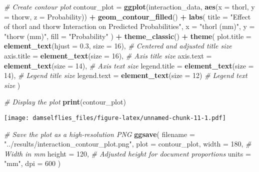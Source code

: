 \documentclass[
]{article}
\newenvironment{Shaded}{\begin{snugshade}}{\end{snugshade}}
\newcommand{\AttributeTok}[1]{\textcolor[rgb]{0.13,0.29,0.53}{#1}}
\newcommand{\CommentTok}[1]{\textcolor[rgb]{0.56,0.35,0.01}{\textit{#1}}}
\newcommand{\DecValTok}[1]{\textcolor[rgb]{0.00,0.00,0.81}{#1}}
\newcommand{\FloatTok}[1]{\textcolor[rgb]{0.00,0.00,0.81}{#1}}
\newcommand{\FunctionTok}[1]{\textcolor[rgb]{0.13,0.29,0.53}{\textbf{#1}}}
\newcommand{\NormalTok}[1]{#1}
\newcommand{\OtherTok}[1]{\textcolor[rgb]{0.56,0.35,0.01}{#1}}
\newcommand{\SpecialCharTok}[1]{\textcolor[rgb]{0.81,0.36,0.00}{\textbf{#1}}}
\newcommand{\StringTok}[1]{\textcolor[rgb]{0.31,0.60,0.02}{#1}}
\begin{document}
\begin{Shaded}
\begin{Highlighting}[]
\CommentTok{\# Create contour plot}
\NormalTok{contour\_plot }\OtherTok{=} \FunctionTok{ggplot}\NormalTok{(interaction\_data, }\FunctionTok{aes}\NormalTok{(}\AttributeTok{x =}\NormalTok{ thorl, }\AttributeTok{y =}\NormalTok{ thorw, }\AttributeTok{z =}\NormalTok{ Probability)) }\SpecialCharTok{+}
  \FunctionTok{geom\_contour\_filled}\NormalTok{() }\SpecialCharTok{+}
  \FunctionTok{labs}\NormalTok{(}
    \AttributeTok{title =} \StringTok{"Effect of thorl and thorw Interaction on Predicted Probabilities"}\NormalTok{,}
    \AttributeTok{x =} \StringTok{"thorl (mm)"}\NormalTok{,}
    \AttributeTok{y =} \StringTok{"thorw (mm)"}\NormalTok{,}
    \AttributeTok{fill =} \StringTok{"Probability"}
\NormalTok{  ) }\SpecialCharTok{+}
  \FunctionTok{theme\_classic}\NormalTok{() }\SpecialCharTok{+}
  \FunctionTok{theme}\NormalTok{(}
    \AttributeTok{plot.title =} \FunctionTok{element\_text}\NormalTok{(}\AttributeTok{hjust =} \FloatTok{0.3}\NormalTok{, }\AttributeTok{size =} \DecValTok{16}\NormalTok{),  }\CommentTok{\# Centered and adjusted title size}
    \AttributeTok{axis.title =} \FunctionTok{element\_text}\NormalTok{(}\AttributeTok{size =} \DecValTok{16}\NormalTok{),               }\CommentTok{\# Axis title size}
    \AttributeTok{axis.text =} \FunctionTok{element\_text}\NormalTok{(}\AttributeTok{size =} \DecValTok{14}\NormalTok{),                }\CommentTok{\# Axis text size}
    \AttributeTok{legend.title =} \FunctionTok{element\_text}\NormalTok{(}\AttributeTok{size =} \DecValTok{14}\NormalTok{),             }\CommentTok{\# Legend title size}
    \AttributeTok{legend.text =} \FunctionTok{element\_text}\NormalTok{(}\AttributeTok{size =} \DecValTok{12}\NormalTok{)               }\CommentTok{\# Legend text size}
\NormalTok{  )}

\CommentTok{\# Display the plot}
\FunctionTok{print}\NormalTok{(contour\_plot)}
\end{Highlighting}
\end{Shaded}

\texttt{[image: damselflies\_files/figure-latex/unnamed-chunk-11-1.pdf]}

\begin{Shaded}
\begin{Highlighting}[]
\CommentTok{\# Save the plot as a high{-}resolution PNG}
\FunctionTok{ggsave}\NormalTok{(}
  \AttributeTok{filename =} \StringTok{"../results/interaction\_contour\_plot.png"}\NormalTok{, }
  \AttributeTok{plot =}\NormalTok{ contour\_plot, }
  \AttributeTok{width =} \DecValTok{180}\NormalTok{,  }\CommentTok{\# Width in mm}
  \AttributeTok{height =} \DecValTok{120}\NormalTok{, }\CommentTok{\# Adjusted height for document proportions}
  \AttributeTok{units =} \StringTok{"mm"}\NormalTok{,}
  \AttributeTok{dpi =} \DecValTok{600}
\NormalTok{)}
\end{Highlighting}
\end{Shaded}
\end{document}
